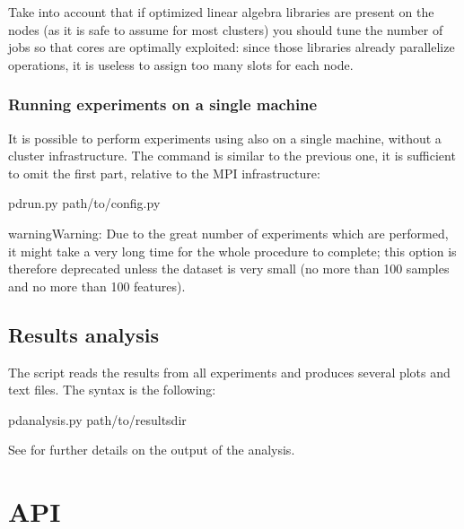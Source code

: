 \documentclass[letterpaper,10pt,english]{sphinxmanual}
\begin{document}
Take into account that if optimized linear algebra libraries are present on the nodes (as it is safe to assume for most clusters) you should tune the number of jobs so that cores are optimally exploited: since those libraries already parallelize operations, it is useless to assign too many slots for each node.


\subsubsection{Running experiments on a single machine}
\label{\detokenize{tutorial:running-experiments-on-a-single-machine}}
It is possible to perform experiments using  also on a single machine, without a cluster infrastructure. The command is similar to the previous one, it is sufficient to omit the first part, relative to the MPI infrastructure:

\begin{sphinxVerbatim}[commandchars=\\\{\}]
\PYGZdl{} pd\PYGZus{}run.py path/to/config.py
\end{sphinxVerbatim}

\begin{sphinxadmonition}{warning}{Warning:}
Due to the great number of experiments which are performed, it might take a very long time for the whole procedure to complete; this option is therefore deprecated unless the dataset is very small (no more than 100 samples and no more than 100 features).
\end{sphinxadmonition}


\subsection{Results analysis}
\label{\detokenize{tutorial:id2}}\label{\detokenize{tutorial:results-analysis}}
The  script reads the results from all experiments and produces several plots and text files. The syntax is the following:

\begin{sphinxVerbatim}[commandchars=\\\{\}]
\PYGZdl{} pd\PYGZus{}analysis.py path/to/results\PYGZus{}dir
\end{sphinxVerbatim}

See {\hyperref[\detokenize{framework:analysis}]{}} for further details on the output of the analysis.


\section{API}
\label{\detokenize{api:api}}\label{\detokenize{api::doc}}\label{\detokenize{api:id1}}
\end{document}
